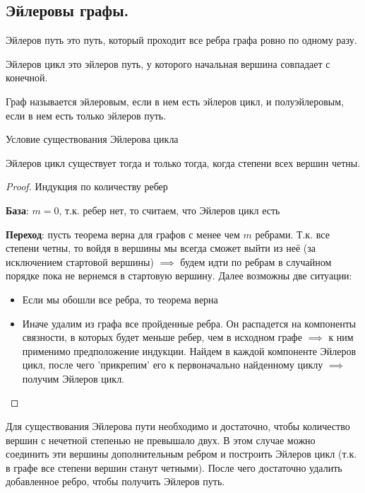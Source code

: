\subsection{%
  Эйлеровы графы.%
}

\begin{definition}
  Эйлеров путь это путь, который проходит все ребра графа ровно по одному разу.
\end{definition}

\begin{definition}
  Эйлеров цикл это эйлеров путь, у которого начальная вершина совпадает с
  конечной.
\end{definition}

\begin{definition}
  Граф называется эйлеровым, если в нем есть эйлеров цикл, и полуэйлеровым, если
  в нем есть только эйлеров путь.
\end{definition}

\begin{theorem}
  Условие существования Эйлерова цикла

  Эйлеров цикл существует тогда и только тогда, когда степени всех вершин четны.  
\end{theorem}
\begin{proof}
  Индукция по количеству ребер

  \textbf{База}: \(m = 0\), т.к. ребер нет, то считаем, что Эйлеров цикл есть

  \textbf{Переход}: пусть теорема верна для графов с менее чем \(m\) ребрами.
  Т.к. все степени четны, то войдя в вершины мы всегда сможет выйти из неё (за
  исключением стартовой вершины) \(\implies\) будем идти по ребрам в случайном
  порядке пока не вернемся в стартовую вершину. Далее возможны две ситуации:

  \begin{itemize}
    \item Если мы обошли все ребра, то теорема верна
    \item Иначе удалим из графа все пройденные ребра. Он распадется на
    компоненты связности, в которых будет меньше ребер, чем в исходном графе
    \(\implies\) к ним применимо предположение индукции. Найдем в каждой
    компоненте Эйлеров цикл, после чего 'прикрепим' его к первоначально
    найденному циклу \(\implies\) получим Эйлеров цикл.
  \end{itemize}
\end{proof}

\begin{remark}
  Для существования Эйлерова пути необходимо и достаточно, чтобы количество
  вершин с нечетной степенью не превышало двух. В этом случае можно соединить
  эти вершины дополнительным ребром и построить Эйлеров цикл (т.к. в графе все
  степени вершин станут четными). После чего достаточно удалить добавленное
  ребро, чтобы получить Эйлеров путь.
\end{remark}
